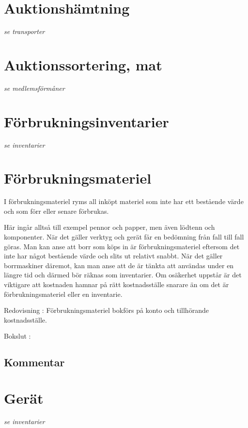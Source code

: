 
				\section{Auktionshämtning}
				\emph{se transporter}
			
				\section{Auktionssortering, mat}
				\emph{se medlemsförmåner}
			
				\section{Förbrukningsinventarier}
				\emph{se inventarier}
			
				\section{Förbrukningsmateriel}
				
				I förbrukningsmateriel ryms all inköpt materiel som inte har ett bestående värde och som förr eller senare förbrukas.
		
		Här ingår alltså till exempel pennor och papper, men även lödtenn och komponenter. När det gäller verktyg och gerät får en bedömning från fall till fall göras. Man kan anse att borr som köps in är förbrukningsmateriel eftersom det inte har något bestående värde och slits ut relativt snabbt. När det gäller borrmaskiner däremot, kan man anse att de är tänkta att användas under en längre tid och därmed bör räknas som inventarier. Om osäkerhet uppstår är det viktigare att kostnaden hamnar på rätt kostnadsställe snarare än om det är förbrukningsmateriel eller en inventarie.
			
				\begin{redovisning}
					Redovisning : Förbrukningsmateriel bokförs på konto  och tillhörande kostnadsställe.
				\end{redovisning}
			
				\begin{bokslut}
					Bokslut : 
				\end{bokslut}
			
				\subsection{Kommentar}
				
				\section{Gerät}
				\emph{se inventarier}
			
